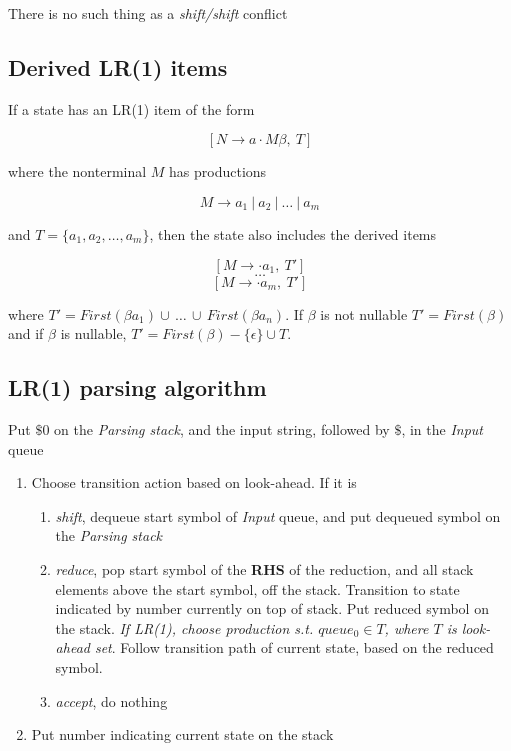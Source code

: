 \documentclass[fontsize=10pt,a4paper]{article}
\begin{document}
\begin{multicols}{3}
    There is no such thing as a \textit{shift/shift} conflict


    \subsection{Derived LR(1) items}

    If a state has an LR(1) item of the form

    \[[N \rightarrow a \cdot M \beta, ~T]\]

    where the nonterminal $M$ has productions

    \[M \rightarrow a_1 ~\vert~ a_2 ~\vert~ \dots ~\vert~ a_m\]

    and $T = \{ a_1, a_2, \dots, a_m \}$, then the state also includes the derived items

    \[[M \rightarrow \cdot a_1, ~T']\]
    \[\dots\]
    \[[M \rightarrow \cdot a_m, ~T']\]

    where $T' = First(\beta a_1) \cup\, \dots\, \cup\, First(\beta a_n)$. If $\beta$ is not nullable $T' = First(\beta)$ and if $\beta$ is nullable, $T' = First(\beta) - \{\epsilon\} \cup T$. 



    \subsection{LR(1) parsing algorithm}

    Put $\$0$ on the \textit{Parsing stack}, and the input string, followed by $\$$, in the \textit{Input} queue

    \begin{enumerate}
        \item Choose transition action based on look-ahead. If it is
        \begin{enumerate}
            \item \textit{shift}, dequeue start symbol of \textit{Input} queue, and put dequeued symbol on the \textit{Parsing stack}
            \item \textit{reduce}, pop start symbol of the \textbf{RHS} of the reduction, and all stack elements above the start symbol, off the stack. Transition to state indicated by number currently on top of stack. Put reduced symbol on the stack. \textit{If LR(1), choose production s.t. $queue_0 \in T$, where $T$ is look-ahead set}. Follow transition path of current state, based on the reduced symbol.
            \item \textit{accept}, do nothing
        \end{enumerate} 
        \item Put number indicating current state on the stack


\end{enumerate}
\end{multicols}
\end{document}
